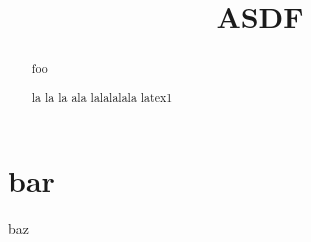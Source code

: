 \documentclass[a4paper,10pt]{article}
\title{ASDF}
\author{}
\begin{document}
\maketitle

\begin{abstract}
foo

la la la ala lalalalala latex1
\end{abstract}

\section{bar}
baz
\end{document}
